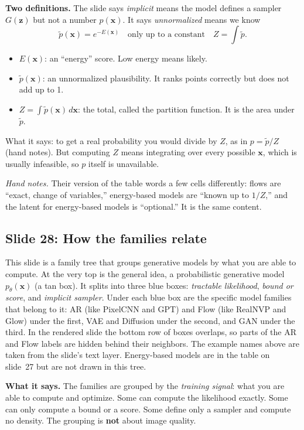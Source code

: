 \textbf{Two definitions.} The slide says \textit{implicit} means the model defines a sampler $G(\mathbf{z})$ but not a number $p(\mathbf{x})$. It says \textit{unnormalized} means we know
\[
\tilde p(\mathbf{x})=e^{-E(\mathbf{x})}\quad\text{only up to a constant}\quad Z=\int\tilde p.
\]
\begin{itemize}
\item $E(\mathbf{x})$: an ``energy'' score. Low energy means likely.
\item $\tilde p(\mathbf{x})$: an unnormalized plausibility. It ranks points correctly but does not add up to 1.
\item $Z=\int\tilde p(\mathbf{x})\,d\mathbf{x}$: the total, called the partition function. It is the area under $\tilde p$.
\end{itemize}
What it says: to get a real probability you would divide by $Z$, as in $p=\tilde p/Z$ (hand notes). But computing $Z$ means integrating over every possible $\mathbf{x}$, which is usually infeasible, so $p$ itself is unavailable.

\textit{Hand notes.} Their version of the table words a few cells differently: flows are ``exact, change of variables,'' energy-based models are ``known up to $1/Z$,'' and the latent for energy-based models is ``optional.'' It is the same content.

\subsection*{Slide 28: How the families relate}

This slide is a family tree that groups generative models by what you are able to compute. At the very top is the general idea, a probabilistic generative model $p_\theta(\mathbf{x})$ (a tan box). It splits into three blue boxes: \textit{tractable likelihood}, \textit{bound or score}, and \textit{implicit sampler}. Under each blue box are the specific model families that belong to it: AR (like PixelCNN and GPT) and Flow (like RealNVP and Glow) under the first, VAE and Diffusion under the second, and GAN under the third. In the rendered slide the bottom row of boxes overlaps, so parts of the AR and Flow labels are hidden behind their neighbors. The example names above are taken from the slide's text layer. Energy-based models are in the table on slide~27 but are not drawn in this tree.

\textbf{What it says.} The families are grouped by the \textit{training signal}: what you are able to compute and optimize. Some can compute the likelihood exactly. Some can only compute a bound or a score. Some define only a sampler and compute no density. The grouping is \textbf{not} about image quality.

